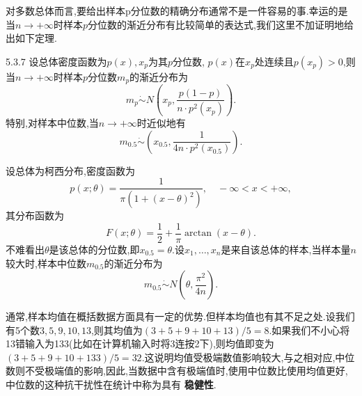 对多数总体而言,要给出样本p分位数的精确分布通常不是一件容易的事.幸运的是当$n\to+\infty$时样本$p$分位数的渐近分布有比较简单的表达式,我们这里不加证明地给出如下定理.
\begin{theorem}{}{5.3.7}
设总体密度函数为$p(x),x_p$为其$p$分位数, $p(x)$在$x_p$处连续且$p(x_p)>0$,则当$n\to+\infty$时样本$p$分位数$m_p$的渐近分布为
\begin{equation}\label{eq:5.3.17}
m_p\dot{\sim}N\left(x_p,\frac{p(1-p)}{n\cdot p^2(x_p)}\right).
\end{equation}
特别,对样本中位数,当$n\to+\infty$时近似地有
\begin{equation}\label{eq:5.3.18}
m_{0.5}\dot{\sim}\left(x_{0.5},\frac1{4n\cdot p^2(x_{0.5})}\right).
\end{equation}
\end{theorem}
\begin{example}\label{5.3.10}
设总体为柯西分布,密度函数为
\[p(x;\theta)=\frac1{\pi(1+(x-\theta)^2)},\quad -\infty<x<+\infty,\]
其分布函数为
\[F(x;\theta)=\frac12+\frac1\pi\arctan(x-\theta).\]
不难看出$\theta$是该总体的分位数,即$x_{0.5}=\theta$.设$x_1,\dotsc,x_n$是来自该总体的样本,当样本量$n$较大时,样本中位数$m_{0.5}$的渐近分布为
\[m_{0.5}\dot{\sim}N\left(\theta,\frac{\pi^2}{4n}\right).\]
\end{example}
通常,样本均值在概括数据方面具有一定的优势.但样本均值也有其不足之处.设我们有5个数$3,5,9,10,13$,则其均值为$(3+5+9+10+13)/5=8$.如果我们不小心将13错输入为133(比如在计算机输入时将3连按2下),则均值即变为$(3+5+9+10+133)/5=32$.这说明均值受极端数值影响较大,与之相对应,中位数则不受极端值的影响,因此,当数据中含有极端值时,使用中位数比使用均值更好,中位数的这种抗干扰性在统计中称为具有 \textbf{稳健性}.
